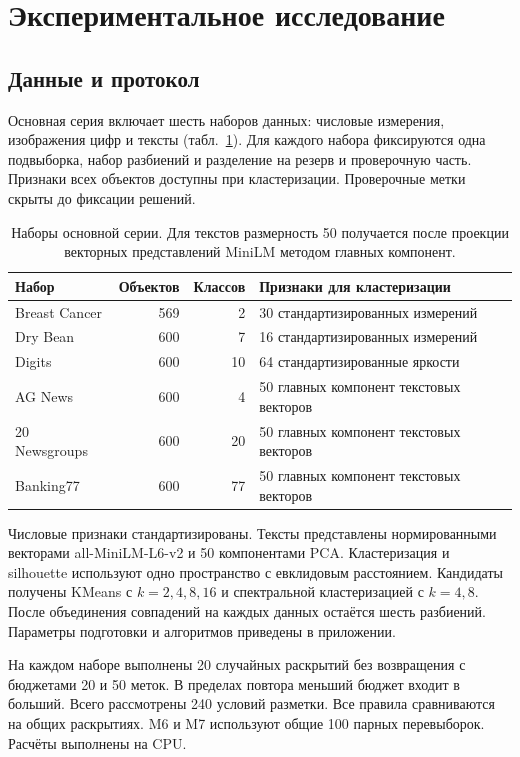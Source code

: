 \section{Экспериментальное исследование}\label{sec:experiments}
\subsection{Данные и протокол}
Основная серия включает шесть наборов данных: числовые измерения, изображения цифр и тексты (табл.~\ref{tab:datasets}). Для каждого набора фиксируются одна подвыборка, набор разбиений и разделение на резерв и проверочную часть. Признаки всех объектов доступны при кластеризации. Проверочные метки скрыты до фиксации решений.

\begin{table}[t]
\centering
\caption{Наборы основной серии. Для текстов размерность 50 получается после проекции векторных представлений MiniLM методом главных компонент.}
\label{tab:datasets}
\begin{tabular}{lrrl}
\toprule
Набор & Объектов & Классов & Признаки для кластеризации\\
\midrule
Breast Cancer & 569 & 2 & 30 стандартизированных измерений\\
Dry Bean & 600 & 7 & 16 стандартизированных измерений\\
Digits & 600 & 10 & 64 стандартизированные яркости\\
AG News & 600 & 4 & 50 главных компонент текстовых векторов\\
20 Newsgroups & 600 & 20 & 50 главных компонент текстовых векторов\\
Banking77 & 600 & 77 & 50 главных компонент текстовых векторов\\
\bottomrule
\end{tabular}
\end{table}

Числовые признаки стандартизированы. Тексты представлены нормированными векторами all-MiniLM-L6-v2 и 50 компонентами PCA. Кластеризация и silhouette используют одно пространство с евклидовым расстоянием. Кандидаты получены KMeans с $k=2,4,8,16$ и спектральной кластеризацией с $k=4,8$. После объединения совпадений на каждых данных остаётся шесть разбиений. Параметры подготовки и алгоритмов приведены в приложении.

На каждом наборе выполнены 20 случайных раскрытий без возвращения с бюджетами 20 и 50 меток. В пределах повтора меньший бюджет входит в больший. Всего рассмотрены 240 условий разметки. Все правила сравниваются на общих раскрытиях. M6 и M7 используют общие 100 парных перевыборок. Расчёты выполнены на CPU.

